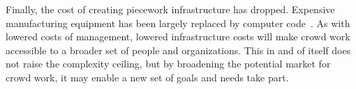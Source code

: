 \documentclass[trackingWork]{subfiles}
\begin{document}
Finally, the cost of creating piecework infrastructure has dropped. 
Expensive manufacturing equipment has been largely replaced by computer code~\cite{lessig2006code}.
As with lowered costs of management, lowered infrastructure costs will make crowd work accessible to a broader set of people and organizations.
This in and of itself does not raise the complexity ceiling, but by broadening the potential market for crowd work, it may enable a new set of goals and needs take part.

\onlyinsubfile{
  \balance{}
  \printbibliography
}
\end{document}
